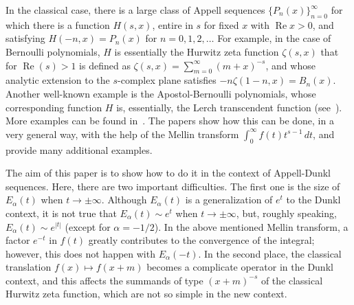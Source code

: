 \documentclass[a4paper]{amsart}
\renewcommand{\Re}{\operatorname{Re}}
\theoremstyle{plain}
\theoremstyle{definition}
\theoremstyle{remark}
\numberwithin{equation}{section}
\begin{document}
In the classical case, there is a large class of Appell sequences $\{P_n(x)\}_{n=0}^\infty$ for which there is a function $H(s,x)$, entire in $s$ for fixed $x$ with $\Re x > 0$, and satisfying $H(-n,x) = P_n(x)$ for $n = 0,1,2,\dots$ For example, in the case of Bernoulli polynomials, $H$ is essentially the Hurwitz zeta function $\zeta(s,x)$ that for $\Re(s)>1$ is defined as $\zeta(s,x) = \sum_{m=0}^{\infty} (m+x)^{-s}$, and whose analytic extension to the $s$-complex plane satisfies $-n\zeta(1-n,x) = B_n(x)$. Another well-known example is the Apostol-Bernoulli polynomials, whose corresponding function $H$ is, essentially, the Lerch transcendent function (see~\cite{Ap}). More examples can be found in~\cite{BayChi, BaySim, SuHu}. The papers \cite{NRV-2018, NRV-2019} show how this can be done, in a very general way, with the help of the Mellin transform $\int_0^\infty f(t) t^{s-1}\,dt$, and provide many additional examples. 

The aim of this paper is to show how to do it in the context of Appell-Dunkl sequences. Here, there are two important difficulties. The first one is the size of $E_\alpha(t)$ when $t \to \pm \infty$. Although $E_\alpha(t)$ is a generalization of $e^t$ to the Dunkl context, it is not true that $E_\alpha(t) \sim e^t$ when $t \to \pm \infty$, but, roughly speaking, $E_\alpha(t) \sim e^{|t|}$ (except for $\alpha=-1/2$). In the above mentioned Mellin transform, a factor $e^{-t}$ in $f(t)$ greatly contributes to the convergence of the integral; however, this does not happen with $E_\alpha(-t)$. In the second place, the classical translation $f(x) \mapsto f(x+m)$ becomes a complicate operator in the Dunkl context, and this affects the summands of type $(x+m)^{-s}$ of the classical Hurwitz zeta function, which are not so simple in the new context.
\end{document}
